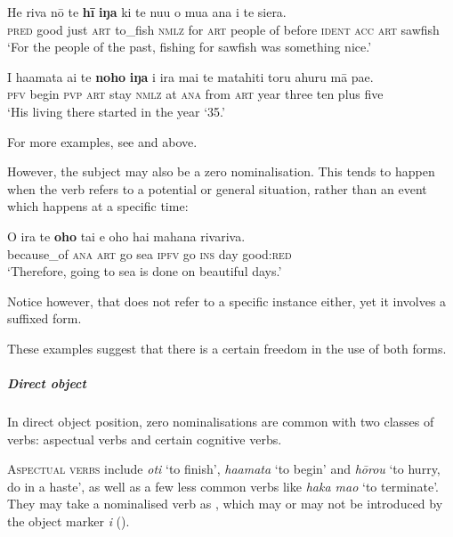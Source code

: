 \ea\label{ex:3.35}
\gll He riva nō te \textbf{hī} \textbf{iŋa} ki te nu{\ꞌ}u o mu{\ꞌ}a {\ꞌ}ana i te siera.\\
\textsc{pred} good just \textsc{art} to\_fish \textsc{nmlz} for \textsc{art} people of before \textsc{ident} \textsc{acc} \textsc{art} sawfish\\

\glt 
‘For the people of the past, fishing for sawfish was something nice.’ \textstyleExampleref{[R364.019]} 
\z

\ea\label{ex:3.36}
\gll I ha{\ꞌ}amata ai te \textbf{noho} \textbf{iŋa} {\ꞌ}i ira mai te matahiti toru {\ꞌ}ahuru mā pae. \\
\textsc{pfv} begin \textsc{pvp} \textsc{art} stay \textsc{nmlz} at \textsc{ana} from \textsc{art} year three ten plus five \\

\glt
‘His living there started in the year ‘35.’ \textstyleExampleref{[R539-1.492]}
\z

For more examples, see  and  above.

\newpage 
However, the subject may also be a zero nominalisation. This tends to happen when the verb refers to a potential or general situation, rather than an event which happens at a specific time:

\ea\label{ex:3.37}
\gll {\ꞌ}O ira te \textbf{oho} tai e oho hai mahana rivariva.\\
because\_of \textsc{ana} \textsc{art} go sea \textsc{ipfv} go \textsc{ins} day good:\textsc{red}\\

\glt
‘Therefore, going to sea is done on beautiful days.’ \textstyleExampleref{[R354.016]} 
\z

Notice however, that  does not refer to a specific instance either, yet it involves a suffixed form. 

These examples suggest that there is a certain freedom in the use of both forms.

\subparagraph{Direct object} In direct object position, zero nominalisations are common with two classes of verbs: aspectual verbs and certain cognitive verbs.

\textsc{Aspectual verbs} include \textit{oti} ‘to finish’, \textit{ha{\ꞌ}amata} ‘to begin’ and \textit{hōrou} ‘to hurry, do in a haste’, as well as a few less common verbs like \textit{haka mao} ‘to terminate’. They may take a nominalised verb as , which may or may not be introduced by the object marker \textit{i} (). 


